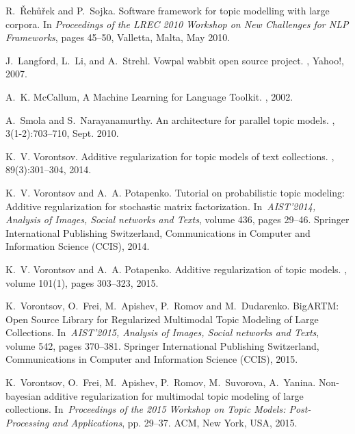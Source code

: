 \documentclass[russian,english]{llncs}
\begin{document}
\begin{thebibliography}{10}
R.~\v{R}eh\r{u}\v{r}ek and P.~Sojka.
\newblock Software framework for topic modelling with large corpora.
\newblock In {\em Proceedings of the {LREC} 2010 Workshop on New Challenges for
	{NLP} Frameworks}, pages 45--50, Valletta, Malta, May 2010.


J.~Langford, L.~Li, and A.~Strehl.
\newblock Vowpal wabbit open source project.
, Yahoo!, 2007.

A.~K. McCallum,
\newblock A Machine Learning for Language Toolkit.
, 2002.
   
A.~Smola and S.~Narayanamurthy.
\newblock An architecture for parallel topic models.
, 3(1-2):703--710, Sept. 2010.

K.~V. Vorontsov.
\newblock Additive regularization for topic models of text collections.
, 89(3):301--304, 2014.

K.~V. Vorontsov and A.~A. Potapenko.
\newblock Tutorial on probabilistic topic modeling: Additive regularization for stochastic matrix factorization.
\newblock In~{\em AIST'2014, Analysis of Images, Social networks and Texts},
volume 436, pages 29--46. Springer International Publishing Switzerland,
Communications in Computer and Information Science (CCIS), 2014.

K.~V. Vorontsov and A.~A. Potapenko.
\newblock Additive regularization of topic models.
, volume 101(1), pages 303--323, 2015.

K.~Vorontsov, O.~Frei, M.~Apishev, P.~Romov and M.~Dudarenko.
\newblock BigARTM: Open Source Library for Regularized Multimodal Topic Modeling of Large Collections.
\newblock In~{\em AIST'2015, Analysis of Images, Social networks and Texts},
volume 542, pages 370--381. Springer International Publishing Switzerland,
Communications in Computer and Information Science (CCIS), 2015.

K.~Vorontsov, O.~Frei, M.~Apishev, P.~Romov, M.~Suvorova, A.~Yanina.
\newblock Non-bayesian additive regularization for multimodal topic modeling of large
collections.
\newblock In~{\em Proceedings of the 2015 Workshop on Topic Models:
Post-Processing and Applications}, pp. 29--37. ACM, New York, USA, 2015.

\end{thebibliography}
\end{document}
